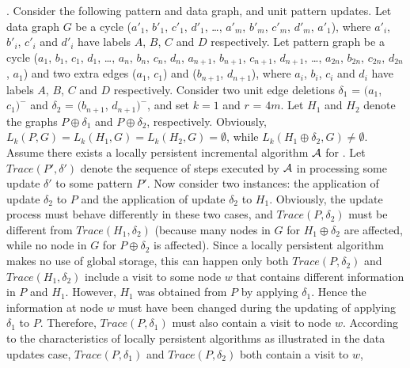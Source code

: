 \vspace{-1ex}
.
Consider the following pattern and data graph, and unit pattern updates.
Let data graph $G$ be a cycle ($a'_1$, $b'_1$, $c'_1$, $d'_1$, \ldots, $a'_m$, $b'_m$, $c'_m$, $d'_m$, $a'_1$),
where $a'_i$, $b'_i$, $c'_i$ and $d'_i$ have labels $A$, $B$, $C$ and $D$ respectively.
Let pattern graph be a cycle ($a_1$, $b_1$, $c_1$, $d_1$, \ldots, $a_n$, $b_n$, $c_n$, $d_n$, $a_{n+1}$, $b_{n+1}$, $c_{n+1}$, $d_{n+1}$, \ldots, $a_{2n}$, $b_{2n}$, $c_{2n}$, $d_{2n}$, $a_1$) and two extra edges ($a_1$, $c_1$) and ($b_{n+1}$, $d_{n+1}$),
where $a_i$, $b_i$, $c_i$ and $d_i$ have labels $A$, $B$, $C$ and $D$ respectively.
Consider two unit edge deletions $\delta_1$ = $(a_1$, $c_1)^-$ and $\delta_2$ = $(b_{n+1}$, $d_{n+1})^-$,
and set $k = 1$ and $r$ = $4m$.
Let $H_1$ and $H_2$ denote the graphs $P\oplus \delta_1$ and $P\oplus \delta_2$, respectively.
Obviously, $L_{k}(P, G) = L_{k}(H_1, G) = L_{k}(H_2, G) = \emptyset$,
while $L_{k}(H_1\oplus \delta_2, G) \neq \emptyset$.
Assume there exists a locally persistent incremental algorithm ${\cal A}$ for \dynteamF.
Let $Trace(P', \delta')$ denote the sequence of steps executed by ${\cal A}$ in processing some update $\delta'$ to some pattern $P'$.
Now consider two instances: the application of update $\delta_2$ to $P$ and the application of update $\delta_2$ to $H_1$.
Obviously, the update process must behave differently in these two cases, and $Trace(P, \delta_2)$ must be different from $Trace(H_1, \delta_2)$
(because many nodes in $G$ for $H_1\oplus \delta_2$ are affected, while no node in $G$ for $P\oplus \delta_2$ is affected).
Since a locally persistent algorithm makes no use of global storage,
this can happen only both $Trace(P, \delta_2)$ and $Trace(H_1, \delta_2)$ include a visit to some node $w$ that contains different information in $P$ and $H_1$.
However, $H_1$ was obtained from $P$ by applying $\delta_1$.
Hence the information at node $w$ must have been changed during the updating of applying $\delta_1$ to $P$.
Therefore, $Trace(P, \delta_1)$ must also contain a visit to node $w$.
According to the characteristics of locally persistent algorithms as illustrated in the data updates case,
$Trace(P, \delta_1)$ and $Trace(P, \delta_2)$ both contain a visit to $w$,
